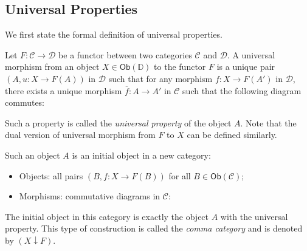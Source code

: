 \documentclass[
	11pt, %
	fleqn, %
	a4paper, %
]{LegrandOrangeBook}
\renewcommand{\bar}[1]{\overline{#1}} %
\newcommand{\C}{\mathcal{C}} %
\newcommand{\D}{\mathcal{D}} %
\newcommand{\Ob}[1]{\mathsf{Ob}(#1)} %
\begin{document}
\begin{appendices}

\renewcommand{\chaptername}{Appendix} %


\chapter{Universal Properties}

We first state the formal definition of universal properties.

\begin{definition}
    Let $F : \C \to \D$ be a functor between two categories $\C$ and $\D$. A universal morphism from an object $X \in \Ob{\mathbb{D}}$ to the functor $F$ is a unique pair $(A, u : X \to F(A))$ in $\D$ such that for any morphism $f : X \to F(A')$ in $\D$, there exists a unique morphism $\bar{f} : A \to A'$ in $\C$ such that the following diagram commutes:
    \begin{center}
    \end{center}
    Such a property is called the \emph{universal property} of the object $A$. Note that the dual version of universal morphism from $F$ to $X$ can be defined similarly.
\end{definition}
\begin{remark}
    Such an object $A$ is an initial object in a new category:
    \begin{itemize}
        \item Objects: all pairs $(B, f : X \to F(B))$ for all $B \in \Ob{\C}$;
        \item Morphisms: commutative diagrams in $\C$:
    \end{itemize}
    \begin{center}
    \end{center}
    The initial object in this category is exactly the object $A$ with the universal property. This type of construction is called the \emph{comma category} and is denoted by $(X \downarrow F)$.


\end{remark}
\end{appendices}
\end{document}
